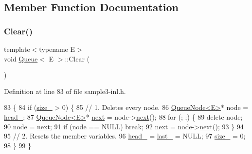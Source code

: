 \subsection{Member Function Documentation}
\mbox{\label{classQueue_acfdd5f9f7e936ca30dcf877370ef9510}} 
\subsubsection{\texorpdfstring{Clear()}{Clear()}}
{\footnotesize\ttfamily template$<$typename E$>$ \\
void \hyperlink{classQueue}{Queue}$<$ E $>$\+::Clear (\begin{DoxyParamCaption}{ }\end{DoxyParamCaption})\hspace{0.3cm}{\ttfamily [inline]}}



Definition at line 83 of file sample3-\/inl.\+h.


\begin{DoxyCode}
83                \{
84     \textcolor{keywordflow}{if} (\hyperlink{classQueue_a7ac3c0717d894e1aecc56f4ddb35c7ea}{size\_} > 0) \{
85       \textcolor{comment}{// 1. Deletes every node.}
86       \hyperlink{classQueueNode}{QueueNode<E>}* node = \hyperlink{classQueue_abf9219bcea800d26e8bfdb4777d98729}{head\_};
87       \hyperlink{classQueueNode}{QueueNode<E>}* \hyperlink{namespacecpp_1_1ast_a39ad8261fef5e0a7c1c17c510541b66f}{next} = node->\hyperlink{classQueueNode_a8a9fdf488da06533360999ef85db56ea}{next}();
88       \textcolor{keywordflow}{for} (; ;) \{
89         \textcolor{keyword}{delete} node;
90         node = \hyperlink{namespacecpp_1_1ast_a39ad8261fef5e0a7c1c17c510541b66f}{next};
91         \textcolor{keywordflow}{if} (node == NULL) \textcolor{keywordflow}{break};
92         next = node->\hyperlink{classQueueNode_a8a9fdf488da06533360999ef85db56ea}{next}();
93       \}
94 
95       \textcolor{comment}{// 2. Resets the member variables.}
96       \hyperlink{classQueue_abf9219bcea800d26e8bfdb4777d98729}{head\_} = \hyperlink{classQueue_a7466dca4f96147c9124af582ab170df0}{last\_} = NULL;
97       \hyperlink{classQueue_a7ac3c0717d894e1aecc56f4ddb35c7ea}{size\_} = 0;
98     \}
99   \}
\end{DoxyCode}
\mbox{\label{classQueue_a434d465001c3078e999f7a89a8af84c0}} 
